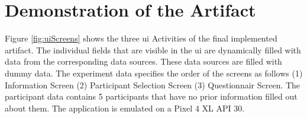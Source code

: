 \newpage\section{Demonstration of the Artifact}

Figure \ref{fig:uiScreens} shows the three \ac{ui} Activities of the final implemented artifact. The individual fields that are visible in the \ac{ui} are dynamically filled with data from the corresponding data sources. These data sources are filled with dummy data. The experiment data specifies the order of the screens as follows (1) Information Screen (2) Participant Selection Screen (3) Questionnair Screen. The participant data contains 5 participants that have no prior information filled out about them. The application is emulated on a Pixel 4 XL API 30.

\begin{figure}[htbp]
    \centering
    \begin{subfigure}[b]{0.25\textwidth}
        \centering

\end{subfigure}
\end{figure}
